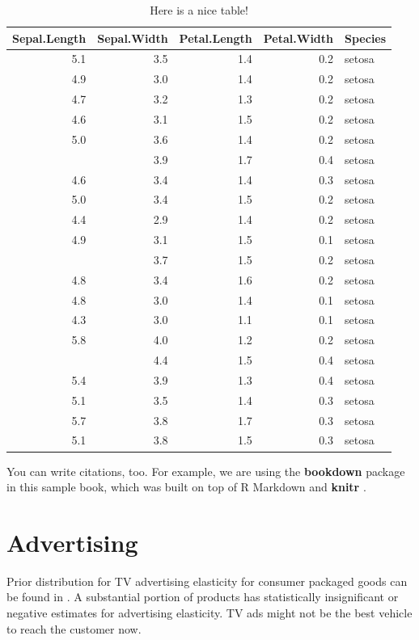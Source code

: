 \documentclass[
]{book}
\begin{document}
\begin{table}

\caption{\label{tab:nice-tab}Here is a nice table!}
\centering
\begin{tabular}[t]{rrrrl}
\toprule
Sepal.Length & Sepal.Width & Petal.Length & Petal.Width & Species\\
\midrule
5.1 & 3.5 & 1.4 & 0.2 & setosa\\
4.9 & 3.0 & 1.4 & 0.2 & setosa\\
4.7 & 3.2 & 1.3 & 0.2 & setosa\\
4.6 & 3.1 & 1.5 & 0.2 & setosa\\
5.0 & 3.6 & 1.4 & 0.2 & setosa\\
\addlinespace
5.4 & 3.9 & 1.7 & 0.4 & setosa\\
4.6 & 3.4 & 1.4 & 0.3 & setosa\\
5.0 & 3.4 & 1.5 & 0.2 & setosa\\
4.4 & 2.9 & 1.4 & 0.2 & setosa\\
4.9 & 3.1 & 1.5 & 0.1 & setosa\\
\addlinespace
5.4 & 3.7 & 1.5 & 0.2 & setosa\\
4.8 & 3.4 & 1.6 & 0.2 & setosa\\
4.8 & 3.0 & 1.4 & 0.1 & setosa\\
4.3 & 3.0 & 1.1 & 0.1 & setosa\\
5.8 & 4.0 & 1.2 & 0.2 & setosa\\
\addlinespace
5.7 & 4.4 & 1.5 & 0.4 & setosa\\
5.4 & 3.9 & 1.3 & 0.4 & setosa\\
5.1 & 3.5 & 1.4 & 0.3 & setosa\\
5.7 & 3.8 & 1.7 & 0.3 & setosa\\
5.1 & 3.8 & 1.5 & 0.3 & setosa\\
\bottomrule
\end{tabular}
\end{table}

You can write citations, too. For example, we are using the \textbf{bookdown} package \citep{R-bookdown} in this sample book, which was built on top of R Markdown and \textbf{knitr} \citep{xie2015}.

\hypertarget{advertising}{%
\chapter{Advertising}\label{advertising}}

Prior distribution for TV advertising elasticity for consumer packaged goods can be found in \citep{Shapiro_2018}.
A substantial portion of products has statistically insignificant or negative estimates for advertising elasticity. TV ads might not be the best vehicle to reach the customer now.
\end{document}
